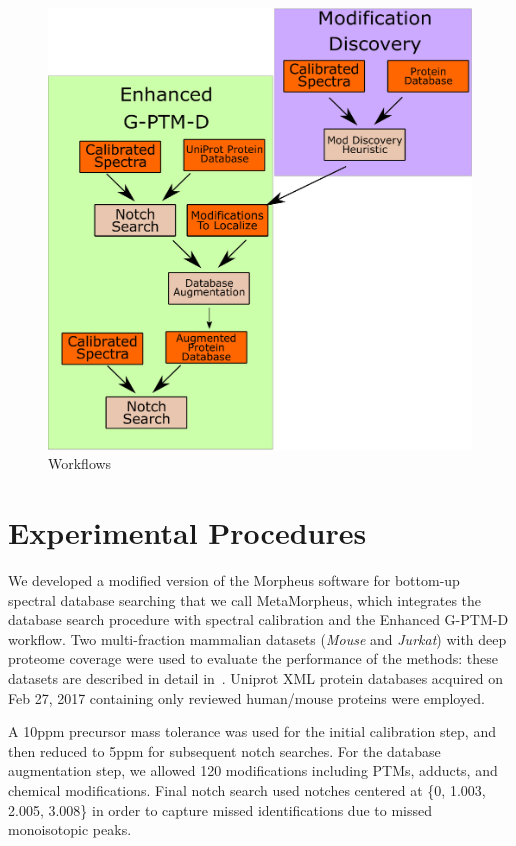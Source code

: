 \documentclass[journal=jprobs,manuscript=article]{achemso}
\begin{document}
\begin{figure}
  \includegraphics[scale=0.5]{diagram.eps}
  \caption{Workflows}
  \label{fgr:diagram}
\end{figure}


\section{Experimental Procedures}
We developed a modified version of the Morpheus software for bottom-up spectral database searching\cite{Wenger_2013} that we call MetaMorpheus, which integrates the database search procedure with spectral calibration and the Enhanced G-PTM-D workflow.
Two multi-fraction mammalian datasets (\textit{Mouse} and \textit{Jurkat}) with deep proteome coverage were used to evaluate the performance of the methods: these datasets are described in detail in~\cite{Shortreed_2015, Cesnik_2016}.
Uniprot XML protein databases acquired on Feb 27, 2017 containing only reviewed human/mouse proteins were employed. 

A 10ppm precursor mass tolerance was used for the initial calibration step, and then reduced to 5ppm for subsequent notch searches.
For the database augmentation step, we allowed 120 modifications including PTMs, adducts, and chemical modifications.
Final notch search used notches centered at \{0, 1.003, 2.005, 3.008\} in order to capture missed identifications due to missed monoisotopic peaks.
\end{document}
